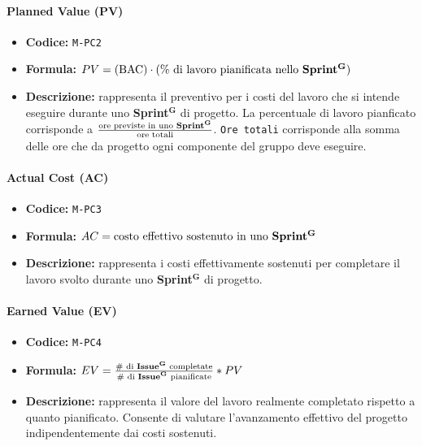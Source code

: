 \documentclass[a4paper,12pt]{article}
\newcommand{\term}[1]{\textbf{#1}$^\mathbf{G}$}
\begin{document}
\paragraph{Planned Value (PV)}
\begin{itemize}
    \item \textbf{Codice:} \texttt{M-PC2}
    \item \textbf{Formula:} $PV=(\text{BAC})\cdot(\text{\% di lavoro pianificata nello \term{Sprint}})$
    \item \textbf{Descrizione:} rappresenta il preventivo per i costi del lavoro che si intende eseguire durante uno \term{Sprint} di progetto. La percentuale di lavoro pianficato corrisponde a $\frac{\text{ore previste in uno \term{Sprint}}}{\text{ore totali}}$. \texttt{Ore totali} corrisponde alla somma delle ore che da progetto ogni componente del gruppo deve eseguire.
\end{itemize}

\paragraph{Actual Cost (AC)}
\begin{itemize}
    \item \textbf{Codice:} \texttt{M-PC3}
    \item \textbf{Formula:} $AC=\text{costo effettivo sostenuto in uno \term{Sprint}}$
    \item \textbf{Descrizione:} rappresenta i costi effettivamente sostenuti per completare il lavoro svolto durante uno \term{Sprint} di progetto.
\end{itemize}

\paragraph{Earned Value (EV)}
\begin{itemize}
    \item \textbf{Codice:} \texttt{M-PC4}
    \item \textbf{Formula:} $EV=\frac{\text{\# di \term{Issue} completate}}{\text{\# di \term{Issue} pianificate}}*PV$
    \item \textbf{Descrizione:} rappresenta il valore del lavoro realmente completato rispetto a quanto pianificato. Consente di valutare l’avanzamento effettivo del progetto indipendentemente dai costi sostenuti.
\end{itemize}
\end{document}
